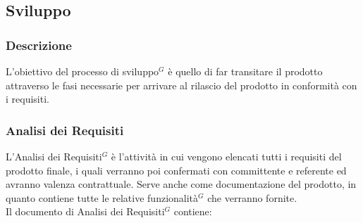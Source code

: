 \documentclass[a4paper,10pt]{article}
\begin{document}
\subsection{Sviluppo}
\subsubsection{Descrizione}
L'obiettivo del processo di sviluppo$^G$ è quello di far transitare il prodotto attraverso le fasi necessarie per arrivare
al rilascio del prodotto in conformità con i requisiti.
\subsubsection{Analisi dei Requisiti}
L'Analisi dei Requisiti$^G$ è l'attività in cui vengono elencati tutti i requisiti del prodotto finale,
i quali verranno poi confermati con committente e referente ed avranno valenza contrattuale.
Serve anche come documentazione del prodotto, in quanto contiene tutte le relative funzionalità$^G$ che verranno fornite. \\
Il documento di Analisi dei Requisiti$^G$ contiene: 
\end{document}
